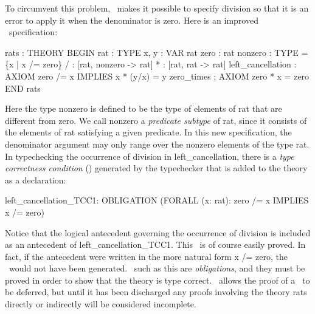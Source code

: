 To circumvent this problem, \pvs\ makes it possible to specify division
so that it is an error to apply it when the denominator is zero.  Here
is an improved \pvs\ specification:
\begin{pvsex}
  rats : THEORY
   BEGIN
    rat : TYPE
    x, y : VAR rat
    zero : rat
    nonzero : TYPE = \{x | x /= zero\}
    / : [rat, nonzero -> rat]
    * : [rat, rat -> rat]
    left\_cancellation : AXIOM zero /= x IMPLIES x * (y/x)  = y
    zero\_times : AXIOM zero * x = zero
   END rats
\end{pvsex}
%
Here the type {\stt nonzero} is defined to be the type of elements of
{\stt rat} that are different from {\stt zero}.  We call {\stt nonzero} a
{\em predicate subtype} of {\stt rat}, since it consists of the elements
of {\stt rat} satisfying a given predicate.  In this new specification,
the denominator argument may only range over the nonzero elements of the
type {\stt rat}.  In typechecking the occurrence of division in {\stt
left\_cancellation}, there is a {\em type correctness condition\/} (\tcc)
generated by the typechecker that is added to the theory as a
declaration:
\begin{pvsex}
  left\_cancellation\_TCC1: OBLIGATION
        (FORALL (x: rat): zero /= x IMPLIES x /= zero)
\end{pvsex}
%
Notice that the logical antecedent governing the occurrence of division
is included as an antecedent of {\stt left\_cancellation\_TCC1}.  This
\tcc\ is of course easily proved.  In fact, if the antecedent were
written in the more natural form {\stt x /= zero}, the \tcc\ would not
have been generated.  \tccs\ such as this are {\em obligations\/}, and
they must be proved in order to show that the theory is type correct.
\pvs\ allows the proof of a \tcc\ to be deferred, but until it has been
discharged any proofs involving the theory {\stt rats} directly or
indirectly will be considered incomplete.

